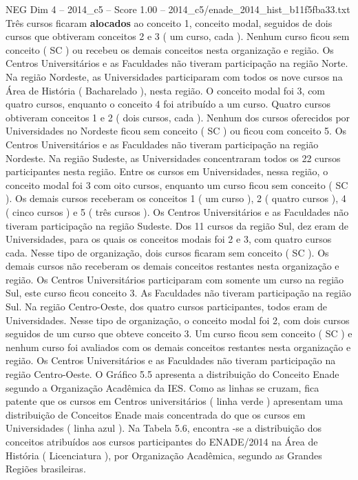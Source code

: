 \begin{textsample}{NEG Dim 4 – 2014\_c5 – Score 1.00 – 2014\_c5/enade\_2014\_hist\_b11f5fba33.txt}
Três cursos ficaram \textbf{alocados} ao conceito 1, conceito modal, seguidos de dois cursos que obtiveram conceitos 2 e 3 ( um curso, cada ).
Nenhum curso ficou sem conceito ( SC ) ou recebeu os demais conceitos nesta organização e região.
Os Centros Universitários e as Faculdades não tiveram participação na região Norte.
Na região Nordeste, as Universidades participaram com todos os nove cursos na Área de História ( Bacharelado ), nesta região.
O conceito modal foi 3, com quatro cursos, enquanto o conceito 4 foi atribuído a um curso.
Quatro cursos obtiveram conceitos 1 e 2 ( dois cursos, cada ).
Nenhum dos cursos oferecidos por Universidades no Nordeste ficou sem conceito ( SC ) ou ficou com conceito 5.
Os Centros Universitários e as Faculdades não tiveram participação na região Nordeste.
Na região Sudeste, as Universidades concentraram todos os 22 cursos participantes nesta região.
Entre os cursos em Universidades, nessa região, o conceito modal foi 3 com oito cursos, enquanto um curso ficou sem conceito ( SC ).
Os demais cursos receberam os conceitos 1 ( um curso ), 2 ( quatro cursos ), 4 ( cinco cursos ) e 5 ( três cursos ).
Os Centros Universitários e as Faculdades não tiveram participação na região Sudeste.
Dos 11 cursos da região Sul, dez eram de Universidades, para os quais os conceitos modais foi 2 e 3, com quatro cursos cada.
Nesse tipo de organização, dois cursos ficaram sem conceito ( SC ).
Os demais cursos não receberam os demais conceitos restantes nesta organização e região.
Os Centros Universitários participaram com somente um curso na região Sul, este curso ficou conceito 3.
As Faculdades não tiveram participação na região Sul.
Na região Centro-Oeste, dos quatro cursos participantes, todos eram de Universidades.
Nesse tipo de organização, o conceito modal foi 2, com dois cursos seguidos de um curso que obteve conceito 3.
Um curso ficou sem conceito ( SC ) e nenhum curso foi avaliados com os demais conceitos restantes nesta organização e região.
Os Centros Universitários e as Faculdades não tiveram participação na região Centro-Oeste.
O Gráfico 5.5 apresenta a distribuição do Conceito Enade segundo a Organização Acadêmica da IES.
Como as linhas se cruzam, fica patente que os cursos em Centros universitários ( linha verde ) apresentam uma distribuição de Conceitos Enade mais concentrada do que os cursos em Universidades ( linha azul ).
Na Tabela 5.6, encontra -se a distribuição dos conceitos atribuídos aos cursos participantes do ENADE/2014 na Área de História ( Licenciatura ), por Organização Acadêmica, segundo as Grandes Regiões brasileiras.

\end{textsample}
